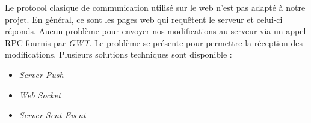	Le protocol clasique de communication utilisé sur le web n'est pas 
	adapté à notre projet. En général, ce sont les pages web qui requêtent
	le serveur et celui-ci réponds. Aucun problème pour envoyer nos modifications 
	au serveur via un appel RPC fournis par \emph{GWT}. Le problème se présente
	pour permettre la réception des modifications. Plusieurs solutions 
	techniques sont disponible :
	\begin{itemize}
		\item \emph{Server Push}
		\item \emph{Web Socket}
		\item \emph{Server Sent Event}
	\end{itemize}

